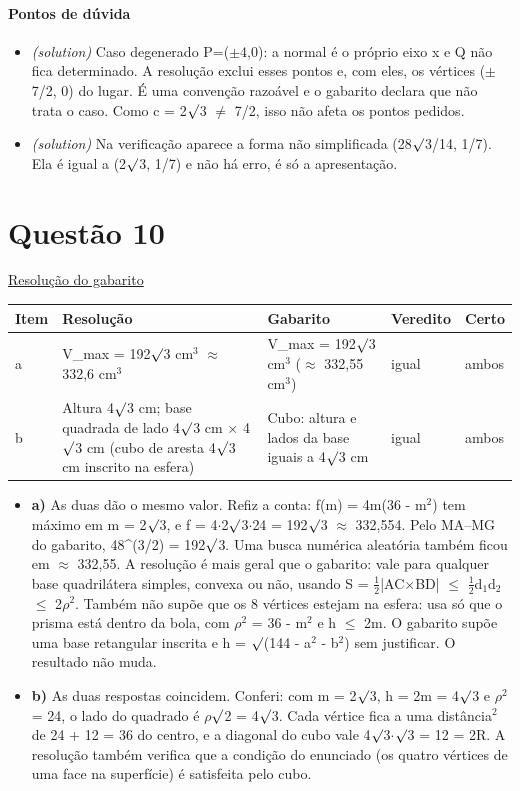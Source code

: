 \documentclass{article}%
\begin{document}
\paragraph{Pontos de dúvida}%
\begin{itemize}%
\item%
\textit{(solution)} Caso degenerado P=($\pm$4,0): a normal é o próprio eixo x e Q não fica determinado. A resolução exclui esses pontos e, com eles, os vértices ($\pm$7/2, 0) do lugar. É uma convenção razoável e o gabarito declara que não trata o caso. Como c = 2$\surd$3 $\neq$ 7/2, isso não afeta os pontos pedidos.%
\item%
\textit{(solution)} Na verificação aparece a forma não simplificada (28$\surd$3/14, 1/7). Ela é igual a (2$\surd$3, 1/7) e não há erro, é só a apresentação.%
\end{itemize}%
\section*{Questão 10}%
\href{https://poliedroresolve.sistemapoliedro.com.br/vestibulares/ime/2027/ime-2-fase-dia-1-26-10-2026-2-fase-dia-1/dissertativa-10-matematica-2-fase-dia-1-ime-2027}{Resolução do gabarito}\par\smallskip%
\begin{longtable}{@{}p{} p{} p{} p{} p{}@{}}\toprule Item & Resolução & Gabarito & Veredito & Certo \\ \midrule
a & V\_max = 192$\surd$3 cm$^3$ $\approx$ 332,6 cm$^3$ & V\_max = 192$\surd$3 cm$^3$ ($\approx$ 332,55 cm$^3$) & igual & ambos \\
b & Altura 4$\surd$3 cm; base quadrada de lado 4$\surd$3 cm $\times$ 4$\surd$3 cm (cubo de aresta 4$\surd$3 cm inscrito na esfera) & Cubo: altura e lados da base iguais a 4$\surd$3 cm & igual & ambos \\
\bottomrule\end{longtable}%
\begin{itemize}%
\item%
\textbf{a)} As duas dão o mesmo valor. Refiz a conta: f(m) = 4m(36 - m$^2$) tem máximo em m = 2$\surd$3, e f = 4$\cdot$2$\surd$3$\cdot$24 = 192$\surd$3 $\approx$ 332,554. Pelo MA--MG do gabarito, 48\^{}(3/2) = 192$\surd$3. Uma busca numérica aleatória também ficou em $\approx$ 332,55. A resolução é mais geral que o gabarito: vale para qualquer base quadrilátera simples, convexa ou não, usando S = $\frac12$|AC$\times$BD| $\leq$ $\frac12$d$_{1}$d$_{2}$ $\leq$ 2$\rho$$^2$. Também não supõe que os 8 vértices estejam na esfera: usa só que o prisma está dentro da bola, com $\rho$$^2$ = 36 - m$^2$ e h $\leq$ 2m. O gabarito supõe uma base retangular inscrita e h = $\surd$(144 - a$^2$ - b$^2$) sem justificar. O resultado não muda.%
\item%
\textbf{b)} As duas respostas coincidem. Conferi: com m = 2$\surd$3, h = 2m = 4$\surd$3 e $\rho$$^2$ = 24, o lado do quadrado é $\rho$$\surd$2 = 4$\surd$3. Cada vértice fica a uma distância$^2$ de 24 + 12 = 36 do centro, e a diagonal do cubo vale 4$\surd$3$\cdot$$\surd$3 = 12 = 2R. A resolução também verifica que a condição do enunciado (os quatro vértices de uma face na superfície) é satisfeita pelo cubo.%
\end{itemize}%
\end{document}
